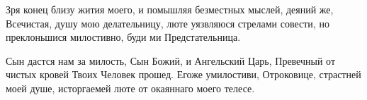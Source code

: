 \begin{mymulticols}
\slava

Зря конец близу жития моего, и помышляя безместных мыслей, деяний же, Всечистая, душу мою делательницу, люте уязвляюся стрелами совести, но преклоньшися милостивно, буди ми Предстательница.

\inyne

 Сын дастся нам за милость, Сын Божий, и Ангельский Царь, Превечный от чистых кровей Твоих Человек прошед. Егоже умилостиви, Отроковице, страстней моей душе, исторгаемей люте от окаяннаго моего телесе.

 \Chestneyshuyu

\end{mymulticols}

\mychapterending

